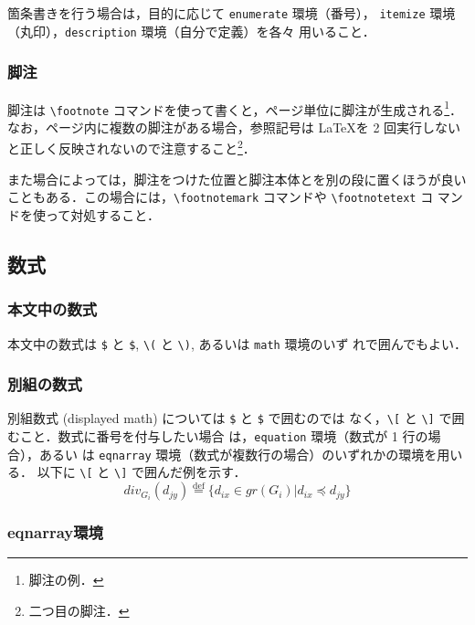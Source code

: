 \documentclass[a4j]{matsushita-zemi}
\begin{document}
箇条書きを行う場合は，目的に応じて \verb|enumerate| 環境（番号），
\verb|itemize| 環境（丸印），\verb|description| 環境（自分で定義）を各々
用いること．


\subsubsection{脚注}

脚注は \verb|\footnote| コマンドを使って書くと，ページ単位に脚注が生成される\footnote{脚注の例．}．
なお，ページ内に複数の脚注がある場合，参照記号は \LaTeX を 2 回実行しない
と正しく反映されないので注意すること\footnote{二つ目の脚注．}．
 
また場合によっては，脚注をつけた位置と脚注本体とを別の段に置くほうが良い
こともある．この場合には，\verb|\footnotemark| コマンドや \verb|\footnotetext| コ
マンドを使って対処すること．

\subsection{数式}\label{sec:Item}

\subsubsection{本文中の数式}

本文中の数式は \verb|$| と \verb|$|, \verb|\(| と \verb|\)|, あるいは \verb|math| 環境のいず
れで囲んでもよい．

\subsubsection{別組の数式}

別組数式 (displayed math) については \verb|$| と \verb|$| で囲むのでは
なく，\verb|\[| と \verb|\]| で囲むこと．数式に番号を付与したい場合
は，\verb|equation| 環境（数式が 1 行の場合），あるい
は \verb|eqnarray| 環境（数式が複数行の場合）のいずれかの環境を用いる．
以下に \verb|\[| と \verb|\]| で囲んだ例を示す．
\[
\mathit{div}_{G_i}(d_{jy}) 
\stackrel{\mathrm{def}}{=}\{d_{ix} \in \mathit{gr}(G_i) | d_{ix} \preceq d_{jy}\}
\]


\subsubsection{eqnarray環境}
\end{document}
